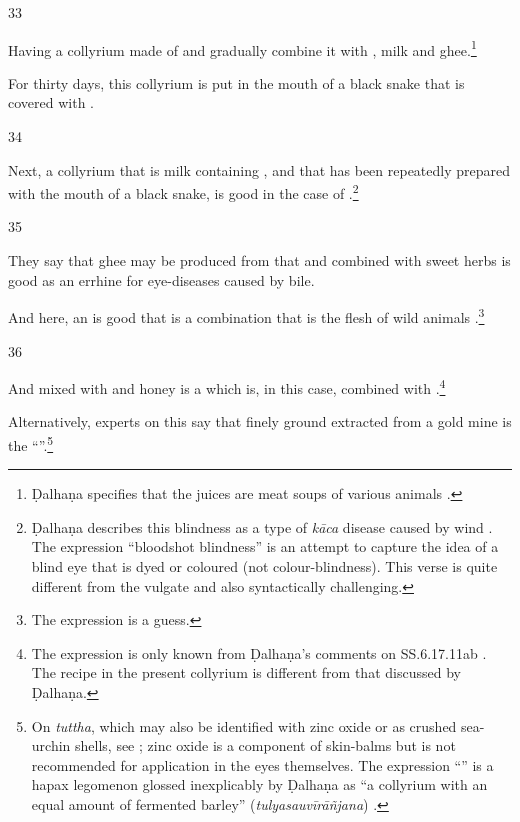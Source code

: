 \begin{translation}
    \item [33]
    
    Having 
    a collyrium made of 
    and gradually combine it with
    , milk and ghee.\footnote{Ḍalhaṇa specifies that the juices are 
    meat soups of various animals \citep[628]{vulgate}.}
    
    For thirty days, this collyrium is put in the mouth of a black snake that is
    covered with .
    
    \item [34]
    
    Next, a collyrium that is milk containing ,
     and  that has been repeatedly 
    prepared
    with the mouth of a black snake, is good in the case of .\footnote{Ḍalhaṇa describes this blindness as a type
    of \emph{kāca} disease caused by wind  \citep[628]{susr-trikamji3}. The expression
    “bloodshot blindness” is an attempt to capture the idea of a blind eye that is
    dyed or coloured (not colour-blindness). This verse is quite different from the
    vulgate and also syntactically challenging.}
    
    \item [35]
    
    They say that ghee may be produced from that and combined with sweet herbs is 
    good as an errhine for eye-diseases caused by bile.
    
    And here, an  is good that is a combination that is the flesh of
    wild animals .\footnote{The expression
     is a guess.  }
    
    
    \item[36]
    
    And 
     mixed with 
     and honey is a 
     which is, in this case, combined with 
    .\footnote{The expression  is
    only known from Ḍalhaṇa's comments on SS.6.17.11ab \citep[626]{vulgate}.  The
    recipe in the present collyrium is different from that discussed by Ḍalhaṇa.}
    
    Alternatively, experts on this say that finely ground  extracted from a gold mine is the “”.\footnote{On \emph{tuttha}, which may also be identified with zinc
oxide or as crushed sea-urchin shells, see \citet[112\,ff.]{falk-1991}; zinc
oxide is a component of skin-balms but is not recommended for application in
the eyes themselves.  The expression “” is a
hapax legomenon glossed inexplicably by Ḍalhaṇa as “a collyrium with an equal
amount of fermented barley” (\emph{tulyasauvīrāñjana}) \citep[628]{vulgate}.}
    

\end{translation}
